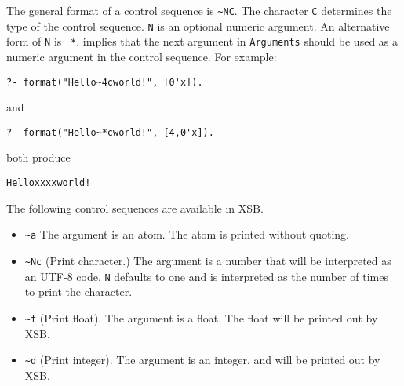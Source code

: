 \begin{description}
The general format of a control sequence is \verb|~NC|.  The character
{\tt C} determines the type of the control sequence.  {\tt N} is an
optional numeric argument.  An alternative form of {\tt N} is {\tt
*}. {\tt *} implies that the next argument in {\tt Arguments} should
be used as a numeric argument in the control sequence.  For example:

\begin{verbatim}
?- format("Hello~4cworld!", [0'x]).
\end{verbatim}

\noindent
and

\begin{verbatim}
?- format("Hello~*cworld!", [4,0'x]).
\end{verbatim}

\noindent
both produce

\begin{verbatim}
Helloxxxxworld!
\end{verbatim}

The following control sequences are available in XSB.


\begin{itemize}

\item \verb|~a|
The argument is an atom.  The atom is printed without quoting.  

\item \verb|~Nc|
(Print character.)  The argument is a number that will be interpreted as an
UTF-8 code. {\tt N} defaults to one and is interpreted as the number of
times to print the character.  

\item \verb|~f|
(Print float).  The argument is a float.  The float will be printed out by XSB.

\item \verb|~d|
(Print integer).  The argument is an integer, and will be printed out by XSB.

\end{itemize}
\end{description}
